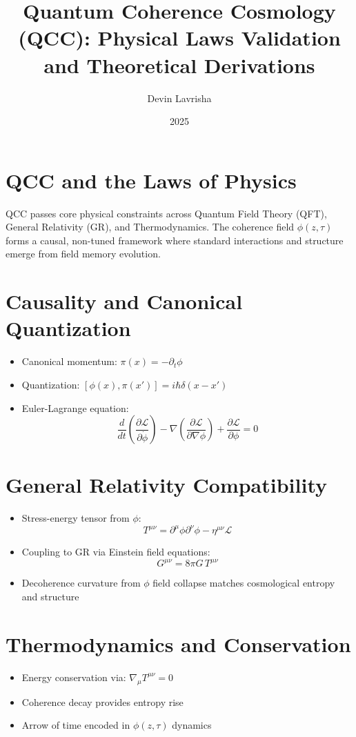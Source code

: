 \documentclass[12pt]{article}
\title{Quantum Coherence Cosmology (QCC): Physical Laws Validation and Theoretical Derivations}
\author{Devin Lavrisha}
\date{2025}
\begin{document}
\maketitle

\section*{QCC and the Laws of Physics}
QCC passes core physical constraints across Quantum Field Theory (QFT), General Relativity (GR), and Thermodynamics. The coherence field $\phi(z, \tau)$ forms a causal, non-tuned framework where standard interactions and structure emerge from field memory evolution.

\section*{Causality and Canonical Quantization}
\begin{itemize}
  \item Canonical momentum: $\pi(x) = -\partial_t \phi$
  \item Quantization: $[\phi(x), \pi(x')] = i \hbar \delta(x - x')$
  \item Euler-Lagrange equation:
  \[
  \frac{d}{dt} \left( \frac{\partial \mathcal{L}}{\partial \dot{\phi}} \right) - \nabla \left( \frac{\partial \mathcal{L}}{\partial \nabla \phi} \right) + \frac{\partial \mathcal{L}}{\partial \phi} = 0
  \]
\end{itemize}

\section*{General Relativity Compatibility}
\begin{itemize}
  \item Stress-energy tensor from $\phi$:
  \[
  T^{\mu\nu} = \partial^\mu \phi \partial^\nu \phi - \eta^{\mu\nu} \mathcal{L}
  \]
  \item Coupling to GR via Einstein field equations:
  \[
  G^{\mu\nu} = 8 \pi G \, T^{\mu\nu}
  \]
  \item Decoherence curvature from $\phi$ field collapse matches cosmological entropy and structure
\end{itemize}

\section*{Thermodynamics and Conservation}
\begin{itemize}
  \item Energy conservation via: $\nabla_\mu T^{\mu\nu} = 0$
  \item Coherence decay provides entropy rise
  \item Arrow of time encoded in $\phi(z, \tau)$ dynamics
\end{itemize}
\end{document}
